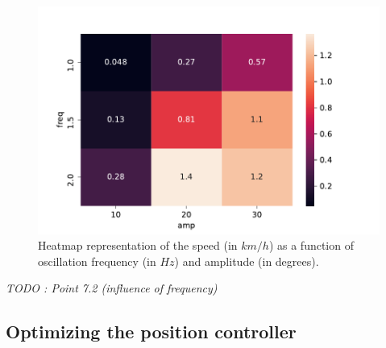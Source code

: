 \documentclass[11pt]{article}
\begin{document}
\begin{figure}
    \centering
    \includegraphics{figures/heatmap_speed.pdf}
    \caption{Heatmap representation of the speed (in $km/h$) as a function of oscillation frequency (in $Hz$) and amplitude (in degrees).}
    \label{fig:heatmap_speed}
\end{figure}

\textit{TODO : Point 7.2 (influence of frequency)}

\subsection{Optimizing the position controller}

\printbibliography %
\end{document}
